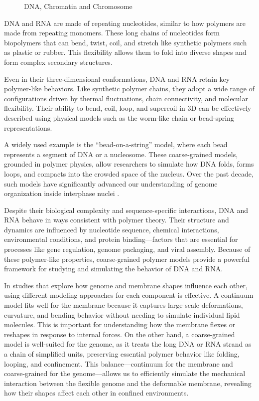 \documentclass[12pt]{article}
\begin{document}
\begin{flushleft}
\begin{figure}[!ht]
  \caption{DNA, Chromatin and Chromosome\cite{byjus_chromatin}}
\end{figure}

DNA and RNA are made of repeating nucleotides, similar to how polymers are made from repeating monomers. These long chains of nucleotides form biopolymers that can bend, twist, coil, and stretch like synthetic polymers such as plastic or rubber. This flexibility allows them to fold into diverse shapes and form complex secondary structures.

Even in their three-dimensional conformations, DNA and RNA retain key polymer-like behaviors. Like synthetic polymer chains, they adopt a wide range of configurations driven by thermal fluctuations, chain connectivity, and molecular flexibility. Their ability to bend, coil, loop, and supercoil in 3D can be effectively described using physical models such as the worm-like chain or bead-spring representations.

A widely used example is the “bead-on-a-string” model, where each bead represents a segment of DNA or a nucleosome. These coarse-grained models, grounded in polymer physics, allow researchers to simulate how DNA folds, forms loops, and compacts into the crowded space of the nucleus. Over the past decade, such models have significantly advanced our understanding of genome organization inside interphase nuclei \cite{Lizana2024}.

Despite their biological complexity and sequence-specific interactions, DNA and RNA behave in ways consistent with polymer theory. Their structure and dynamics are influenced by nucleotide sequence, chemical interactions, environmental conditions, and protein binding—factors that are essential for processes like gene regulation, genome packaging, and viral assembly. Because of these polymer-like properties, coarse-grained polymer models provide a powerful framework for studying and simulating the behavior of DNA and RNA.



In studies that explore how genome and membrane shapes influence each other, using different modeling approaches for each component is effective. A continuum model fits well for the membrane because it captures large-scale deformations, curvature, and bending behavior without needing to simulate individual lipid molecules. This is important for understanding how the membrane flexes or reshapes in response to internal forces. On the other hand, a coarse-grained model is well-suited for the genome, as it treats the long DNA or RNA strand as a chain of simplified units, preserving essential polymer behavior like folding, looping, and confinement. This balance—continuum for the membrane and coarse-grained for the genome—allows us to efficiently simulate the mechanical interaction between the flexible genome and the deformable membrane, revealing how their shapes affect each other in confined environments.




\end{flushleft}
\end{document}
